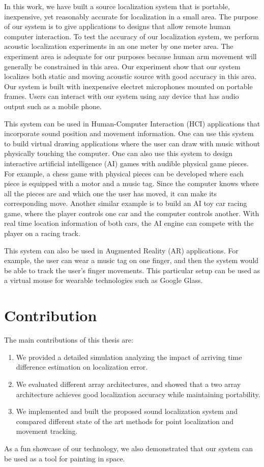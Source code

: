 In this work, we have built a source localization system that is portable, inexpensive, yet reasonably accurate for localization in a small area. The purpose of our system is to give applications to designs that allow remote human computer interaction. To test the accuracy of our localization system, we perform acoustic localization experiments in an one meter by one meter area. The experiment area is adequate for our purposes because human arm movement will generally be constrained in this area. Our experiment show that our system localizes both static and moving acoustic source with good accuracy in this area. Our system is built with inexpensive electret microphones mounted on portable frames. Users can interact with our system using any device that has audio output such as a mobile phone.

This system can be used in Human-Computer Interaction (HCI) applications that incorporate sound position and movement information. One can use this system to build virtual drawing applications where the user can draw with music without physically touching the computer. One can also use this system to design interactive artificial intelligence (AI) games with audible physical game pieces. For example, a chess game with physical pieces can be developed where each piece is equipped with a motor and a music tag. Since the computer knows where all the pieces are and which one the user has moved, it can make its corresponding move. Another similar example is to build an AI toy car racing game, where the player controls one car and the computer controls another. With real time location information of both cars, the AI engine can compete with the player on a racing track. 

This system can also be used in Augmented Reality (AR) applications. For example, the user can wear a music tag on one finger, and then the system would be able to track the user's finger movements. This particular setup can be used as a virtual mouse for wearable technologies such as Google Glass. 


\section{Contribution}
The main contributions of this thesis are:
\begin{enumerate}
\item We provided a detailed simulation analyzing the impact of arriving time difference estimation on localization error. 
\item We evaluated different array architectures, and showed that a two array architecture achieves good localization accuracy while maintaining portability. 
\item We implemented and built the proposed sound localization system and compared different state of the art methods for point localization and movement tracking. 
\end{enumerate}
As a fun showcase of our technology, we also demonstrated that our system can be used as a tool for painting in space.

